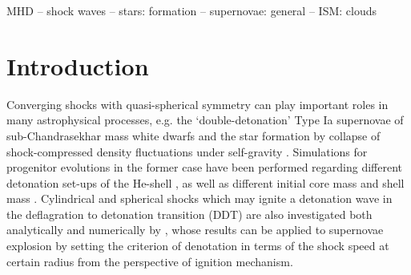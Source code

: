 \documentclass[fleqn,usenatbib]{mnras}
\begin{document}
\begin{keywords}
MHD -- shock waves -- stars: formation -- supernovae: general -- ISM: clouds
\end{keywords}







\section{Introduction}
Converging shocks with quasi-spherical symmetry can play important roles in many astrophysical processes, e.g. the `double-detonation' Type Ia supernovae of sub-Chandrasekhar mass white dwarfs \citep{fink2007double, fink2010double} and the star formation by collapse of shock-compressed density fluctuations under self-gravity \citep{klessen2001formation}. Simulations for progenitor evolutions in the former case have been performed regarding different detonation set-ups of the He-shell \citep{fink2007double}, as well as different initial core mass and shell mass \citep{fink2010double}. Cylindrical and spherical shocks which may ignite a detonation wave in the deflagration to detonation transition (DDT) are also investigated both analytically and numerically by \citet{kushnir2012}, whose results can be applied to supernovae explosion by setting the criterion of denotation in terms of the shock speed at certain radius from the perspective of ignition mechanism. 
\end{document}
